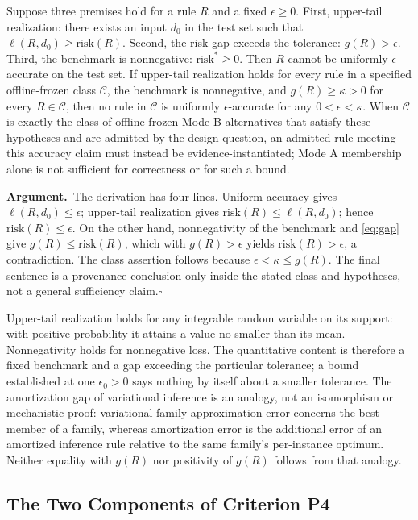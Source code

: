 \documentclass[twoside,11pt]{article}
\newcommand{\argument}{\par\medskip\noindent\textbf{Argument.}\ }
\newcommand{\qedbox}{\hfill$\square$}
\begin{document}
\begin{lemma}
Suppose three premises hold for a rule $R$ and a fixed $\epsilon\geq0$. First, upper-tail realization: there exists an input $d_0$ in the test set such that $\ell(R,d_0)\geq\mathrm{risk}(R)$. Second, the risk gap exceeds the tolerance: $g(R)>\epsilon$. Third, the benchmark is nonnegative: $\mathrm{risk}^*\geq0$. Then $R$ cannot be uniformly $\epsilon$-accurate on the test set. If upper-tail realization holds for every rule in a specified offline-frozen class $\mathcal{C}$, the benchmark is nonnegative, and $g(R)\geq\kappa>0$ for every $R\in\mathcal{C}$, then no rule in $\mathcal{C}$ is uniformly $\epsilon$-accurate for any $0<\epsilon<\kappa$. When $\mathcal{C}$ is exactly the class of offline-frozen Mode B alternatives that satisfy these hypotheses and are admitted by the design question, an admitted rule meeting this accuracy claim must instead be evidence-instantiated; Mode A membership alone is not sufficient for correctness or for such a bound.
\end{lemma}

\argument The derivation has four lines. Uniform accuracy gives $\ell(R,d_0)\leq\epsilon$; upper-tail realization gives $\mathrm{risk}(R)\leq\ell(R,d_0)$; hence $\mathrm{risk}(R)\leq\epsilon$. On the other hand, nonnegativity of the benchmark and \eqref{eq:gap} give $g(R)\leq\mathrm{risk}(R)$, which with $g(R)>\epsilon$ yields $\mathrm{risk}(R)>\epsilon$, a contradiction. The class assertion follows because $\epsilon<\kappa\leq g(R)$. The final sentence is a provenance conclusion only inside the stated class and hypotheses, not a general sufficiency claim.\qedbox

Upper-tail realization holds for any integrable random variable on its support: with positive probability it attains a value no smaller than its mean. Nonnegativity holds for nonnegative loss. The quantitative content is therefore a fixed benchmark and a gap exceeding the particular tolerance; a bound established at one $\epsilon_0>0$ says nothing by itself about a smaller tolerance. The amortization gap of variational inference \citep{cremer2018} is an analogy, not an isomorphism or mechanistic proof: variational-family approximation error concerns the best member of a family, whereas amortization error is the additional error of an amortized inference rule relative to the same family's per-instance optimum. Neither equality with $g(R)$ nor positivity of $g(R)$ follows from that analogy.

\subsection{The Two Components of Criterion P4}
\label{sec:p4}
\end{document}
